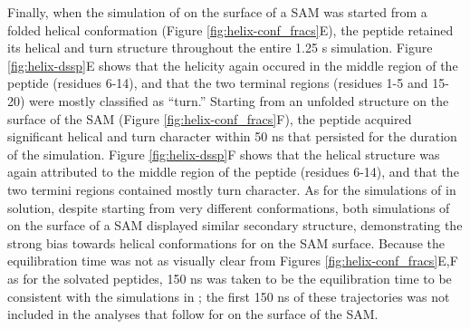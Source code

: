 Finally, when the simulation of \pep{} on the surface of a SAM was started from a folded helical conformation (Figure \ref{fig:helix-conf_fracs}E), the peptide retained its helical and turn structure throughout the entire 1.25 \textmu{}s simulation. 
Figure \ref{fig:helix-dssp}E shows that the helicity again occured in the middle region of the peptide (residues 6-14), and that the two terminal regions (residues 1-5 and 15-20) were mostly classified as ``turn.'' 
Starting from an unfolded structure on the surface of the SAM (Figure \ref{fig:helix-conf_fracs}F), the peptide acquired significant helical and turn character within 50 ns that persisted for the duration of the simulation. 
Figure \ref{fig:helix-dssp}F shows that the helical structure was again attributed to the middle region of the peptide (residues 6-14), and that the two termini regions contained mostly turn character. 
As for the simulations of \pep{} in solution, despite starting from very different conformations, both simulations of \pep{} on the surface of a SAM displayed similar secondary structure, demonstrating the strong bias towards helical conformations for \pep{} on the SAM surface. 
Because the equilibration time was not as visually clear from Figures \ref{fig:helix-conf_fracs}E,F as for the solvated peptides, 150 ns was taken to be the equilibration time to be consistent with the simulations in \tba{}; 
the first 150 ns of these trajectories was not included in the analyses that follow for \pep{} on the surface of the SAM.


